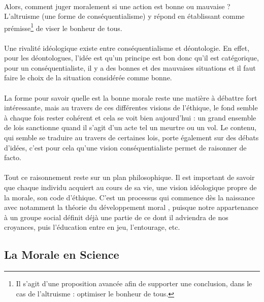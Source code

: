 \documentclass[10pt, french, a4paper]{report}
\begin{document}
\paragraph{}
Alors, comment juger moralement si une action est bonne ou mauvaise ? L’altruisme (une forme de conséquentialisme) y répond en établissant comme prémisse\footnote{Il s'agit d'une proposition avancée afin de supporter une conclusion, dans le cas de l'altruisme : optimiser le bonheur de tous.} de viser le bonheur de tous.

\paragraph{}
Une rivalité idéologique existe entre conséquentialisme et déontologie. En effet, pour les déontologues, l’idée est qu’un principe est bon donc qu’il est catégorique, pour un conséquentialiste, il y a des bonnes et des mauvaises situations et il faut faire le choix de la situation considérée comme bonne.

\paragraph{}
La forme pour savoir quelle est la bonne morale reste une matière à débattre fort intéressante, mais au travers de ces différentes visions de l’éthique, le fond semble à chaque fois rester cohérent et cela se voit bien aujourd’hui : un grand ensemble de lois sanctionne quand il s’agit d’un acte tel un meurtre ou un vol. Le contenu, qui semble se traduire au travers de certaines lois, porte également sur des débats d’idées, c’est pour cela qu’une vision conséquentialiste permet de raisonner de facto.

\paragraph{}
Tout ce raisonnement reste sur un plan philosophique. Il est important de savoir que chaque individu acquiert au cours de sa vie, une vision idéologique propre de la morale, son code d’éthique. C’est un processus qui commence dès la naissance avec notamment la théorie du développement moral \citep{kohlberg_moral_1977}, puisque notre appartenance à un groupe social définit déjà une partie de ce dont il adviendra de nos croyances, puis l’éducation entre en jeu, l’entourage, etc.

\subsection{La Morale en Science}
\label{subsec:morale_science}
\end{document}
